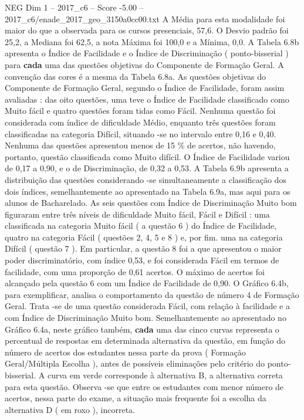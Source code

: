 \begin{textsample}{NEG Dim 1 – 2017\_c6 – Score -5.00 – 2017\_c6/enade\_2017\_geo\_3150a0cc00.txt}
A Média para esta modalidade foi maior do que a observada para os cursos presenciais, 57,6.
O Desvio padrão foi 25,2, a Mediana foi 62,5, a nota Máxima foi 100,0 e a Mínima, 0,0.
A Tabela 6.8b apresenta o Índice de Facilidade e o Índice de Discriminação ( ponto-bisserial ) para \textbf{cada} uma das questões objetivas do Componente de Formação Geral.
A convenção das cores é a mesma da Tabela 6.8a.
As questões objetivas do Componente de Formação Geral, segundo o Índice de Facilidade, foram assim avaliadas : das oito questões, uma teve o Índice de Facilidade classificado como Muito fácil e quatro questões foram tidas como Fácil.
Nenhuma questão foi considerada com índice de dificuldade Médio, enquanto três questões foram classificadas na categoria Difícil, situando -se no intervalo entre 0,16 e 0,40.
Nenhuma das questões apresentou menos de 15 \% de acertos, não havendo, portanto, questão classificada como Muito difícil.
O Índice de Facilidade variou de 0,17 a 0,90, e o de Discriminação, de 0,32 a 0,53.
A Tabela 6.9b apresenta a distribuição das questões considerando -se simultaneamente a classificação dos dois índices, semelhantemente ao apresentado na Tabela 6.9a, mas aqui para os alunos de Bacharelado.
As seis questões com Índice de Discriminação Muito bom figuraram entre três níveis de dificuldade Muito fácil, Fácil e Difícil : uma classificada na categoria Muito fácil ( a questão 6 ) do Índice de Facilidade, quatro na categoria Fácil ( questões 2, 4, 5 e 8 ) e, por fim. uma na categoria Difícil ( questão 7 ).
Em particular, a questão 8 foi a que apresentou o maior poder discriminatório, com índice 0,53, e foi considerada Fácil em termos de facilidade, com uma proporção de 0,61 acertos.
O máximo de acertos foi alcançado pela questão 6 com um Índice de Facilidade de 0,90.
O Gráfico 6.4b, para exemplificar, analisa o comportamento da questão de número 4 de Formação Geral.
Trata -se de uma questão considerada Fácil, com relação à facilidade e a com Índice de Discriminação Muito bom.
Semelhantemente ao apresentado no Gráfico 6.4a, neste gráfico também, \textbf{cada} uma das cinco curvas representa o percentual de respostas em determinada alternativa da questão, em função do número de acertos dos estudantes nessa parte da prova ( Formação Geral/Múltipla Escolha ), antes de possíveis eliminações pelo critério do ponto-bisserial.
A curva em verde corresponde à alternativa B, a alternativa correta para esta questão.
Observa -se que entre os estudantes com menor número de acertos, nessa parte do exame, a situação mais frequente foi a escolha da alternativa D ( em roxo ), incorreta.

\end{textsample}
